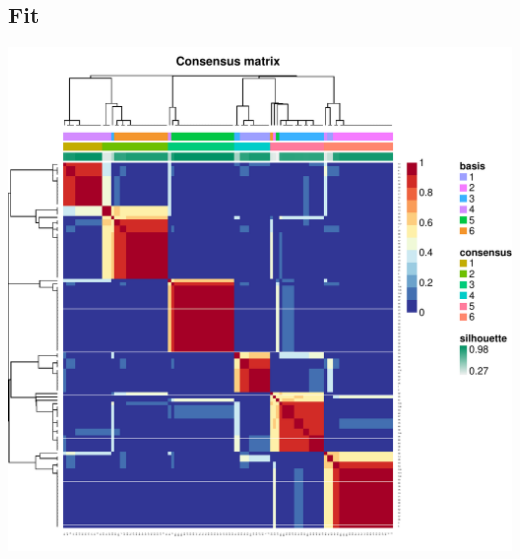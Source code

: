 \documentclass{article}
\begin{document}
\subsection{Fit}
\begin{knitrout}
\color{fgcolor}\begin{kframe}
\begin{alltt}
\end{alltt}
\end{kframe}

{\centering \includegraphics[width=\maxwidth]{figure/nmf-plots-1} 

}


\begin{kframe}\begin{alltt}
\end{alltt}
\end{kframe}


\end{knitrout}
\end{document}
